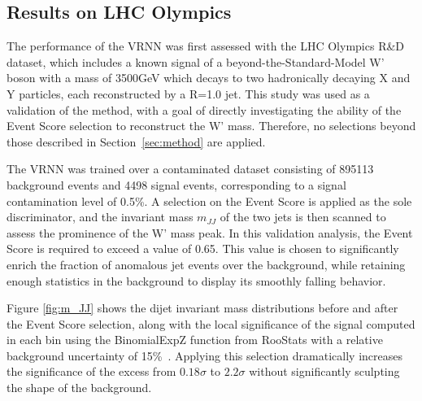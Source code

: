 \documentclass[letterpaper,11pt]{article}
\begin{document}
\subsection{Results on LHC Olympics}
\label{sec:results}


\hspace{\parindent}The performance of the VRNN was first assessed with the LHC Olympics R\&D dataset, which includes a known signal of a beyond-the-Standard-Model W' boson with a mass of 3500GeV which decays to two hadronically decaying X and Y particles, each reconstructed by a R=1.0 jet.
This study was used as a validation of the method, with a goal of directly investigating the ability of the Event Score selection to reconstruct the W' mass. 
Therefore, no selections beyond those described in Section~\ref{sec:method} are applied.


The VRNN was trained over a contaminated dataset consisting of 895113 background events and 4498 signal events, corresponding to a signal contamination level of 0.5\%.
A selection on the Event Score is applied as the sole discriminator, and the invariant mass $m_{JJ}$ of the two jets is then scanned to assess the prominence of the W' mass peak.
In this validation analysis, the Event Score is required to exceed a value of 0.65. 
This value is chosen to significantly enrich the fraction of anomalous jet events over the background, while retaining enough statistics in the background to display its smoothly falling behavior.

Figure \ref{fig:m_JJ} shows the dijet invariant mass distributions before and after the Event Score selection, along with the local significance of the signal computed in each bin using the {\sc BinomialExpZ} function from {\sc RooStats} with a relative background uncertainty of 15\%~\cite{moneta2011roostats}.
Applying this selection dramatically increases the significance of the excess from $0.18\sigma$ to $2.2\sigma$ without significantly sculpting the shape of the background.
\end{document}
